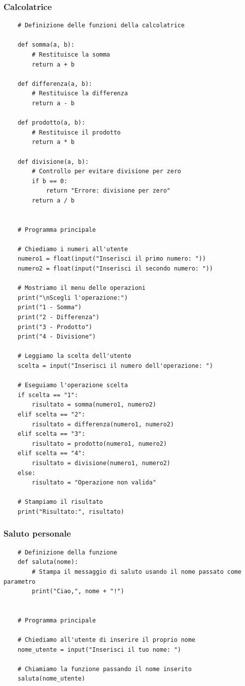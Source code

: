 \documentclass[a4paper,12pt]{article}
\begin{document}
\newpage

\subsubsection{Calcolatrice}


\begin{lstlisting}
	# Definizione delle funzioni della calcolatrice
	
	def somma(a, b):
		# Restituisce la somma
		return a + b
	
	def differenza(a, b):
		# Restituisce la differenza
		return a - b
		
	def prodotto(a, b):
		# Restituisce il prodotto
		return a * b
	
	def divisione(a, b):
		# Controllo per evitare divisione per zero
		if b == 0:
			return "Errore: divisione per zero"
		return a / b
	
	
	# Programma principale
	
	# Chiediamo i numeri all'utente
	numero1 = float(input("Inserisci il primo numero: "))
	numero2 = float(input("Inserisci il secondo numero: "))
	
	# Mostriamo il menu delle operazioni
	print("\nScegli l'operazione:")
	print("1 - Somma")
	print("2 - Differenza")
	print("3 - Prodotto")
	print("4 - Divisione")
	
	# Leggiamo la scelta dell'utente
	scelta = input("Inserisci il numero dell'operazione: ")
	
	# Eseguiamo l'operazione scelta
	if scelta == "1":
		risultato = somma(numero1, numero2)
	elif scelta == "2":
		risultato = differenza(numero1, numero2)
	elif scelta == "3":
		risultato = prodotto(numero1, numero2)
	elif scelta == "4":
		risultato = divisione(numero1, numero2)
	else:
		risultato = "Operazione non valida"
	
	# Stampiamo il risultato
	print("Risultato:", risultato)
\end{lstlisting}


\newpage

\subsubsection{Saluto personale}

\begin{lstlisting}
	# Definizione della funzione
	def saluta(nome):
		# Stampa il messaggio di saluto usando il nome passato come parametro
		print("Ciao,", nome + "!")
	
	
	# Programma principale
	
	# Chiediamo all'utente di inserire il proprio nome
	nome_utente = input("Inserisci il tuo nome: ")
	
	# Chiamiamo la funzione passando il nome inserito
	saluta(nome_utente)
\end{lstlisting}
\end{document}
